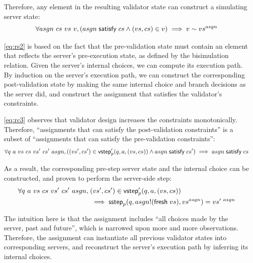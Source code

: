 Therefore, any element in the resulting validator state can construct a
simulating server state:
\[\forall asgn~cs~vs~v,(asgn\;\mathsf{satisfy}\;cs\wedge(vs,cs)\in v)\implies v\sim vs^{asgn}\]

\autoref{eq:rs2} is based on the fact that the pre-validation state must contain
an element that reflects the server's pre-execution state, as defined by the
bisimulation relation.  Given the server's internal choices, we can compute its
execution path.  By induction on the server's execution path, we can construct
the corresponding post-validation state by making the same internal choice and
branch decisions as the server did, and construct the assignment that satisfies
the validator's constraints.

\autoref{eq:rc3} observes that validator design increases the constraints
monotonically.  Therefore, ``assignments that can satisfy the post-validation
constraints'' is a subset of ``assignments that can satisfy the pre-validation
constraints'':
\[\forall q~a~vs~cs~vs'~cs'~asgn,((vs',cs')\in\mathsf{vstep}_p'(q,a,(vs,cs))\wedge asgn\;\mathsf{satisfy}\;cs')\implies asgn\;\mathsf{satisfy}\;cs\]

As a result, the corresponding pre-step server state and the internal choice can
be constructed, and proven to perform the server-side step:
\begin{align*}
\forall q~a~vs~cs~vs'~cs'~asgn,\;&(vs',cs')\in\mathsf{vstep}_p'(q,a,(vs,cs))\\
&\implies\mathsf{sstep}_p(q,asgn!(\mathsf{fresh}\;{vs}),vs^{asgn})=vs'^{~asgn}
\end{align*}

The intuition here is that the assignment includes ``all choices made by the
server, past and future'', which is narrowed upon more and more observations.
Therefore, the assignment can instantiate all previous validator states into
corresponding servers, and reconstruct the server's execution path by inferring
its internal choices.
